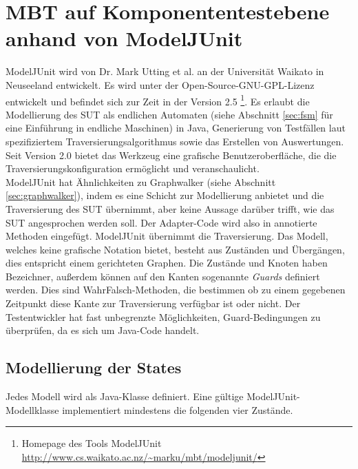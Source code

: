 \section{MBT auf Komponententestebene anhand von ModelJUnit}
\label{sec:modeljunit}
ModelJUnit wird von Dr. Mark Utting et al. an der Universität Waikato in Neuseeland entwickelt. Es wird unter der Open-Source-GNU-GPL-Lizenz entwickelt und befindet sich zur Zeit in der Version 2.5 \footnote{Homepage des Tools ModelJUnit \url{http://www.cs.waikato.ac.nz/~marku/mbt/modeljunit/}}. Es erlaubt die Modellierung des \Gls{SUT} als endlichen Automaten (siehe Abschnitt \ref{sec:fsm} für eine Einführung in endliche Maschinen) in Java, Generierung von Testfällen laut spezifiziertem Traversierungsalgorithmus sowie das Erstellen von Auswertungen. Seit Version 2.0 bietet das Werkzeug eine grafische Benutzeroberfläche, die die Traversierungskonfiguration ermöglicht und veranschaulicht.\\
ModelJUnit hat Ähnlichkeiten zu Graphwalker (siehe Abschnitt \ref{sec:graphwalker}), indem es eine Schicht zur Modellierung anbietet und die Traversierung des \gls{SUT} übernimmt, aber keine Aussage darüber trifft, wie das \gls{SUT} angesprochen werden soll. Der Adapter-Code wird also in annotierte Methoden eingefügt. ModelJUnit übernimmt die Traversierung. Das Modell, welches keine grafische Notation bietet, besteht aus Zuständen und Übergängen, dies entspricht einem gerichteten Graphen. Die Zustände und Knoten haben Bezeichner, außerdem können auf den Kanten sogenannte \textit{Guards} definiert werden. Dies sind WahrFalsch-Methoden, die bestimmen ob zu einem gegebenen Zeitpunkt diese Kante zur Traversierung verfügbar ist oder nicht. Der Testentwickler hat fast unbegrenzte Möglichkeiten, Guard-Bedingungen zu überprüfen, da es sich um Java-Code handelt.

\subsection{Modellierung der States}
Jedes Modell wird als Java-Klasse definiert. Eine gültige ModelJUnit-Modellklasse implementiert mindestens die folgenden vier Zustände. 

